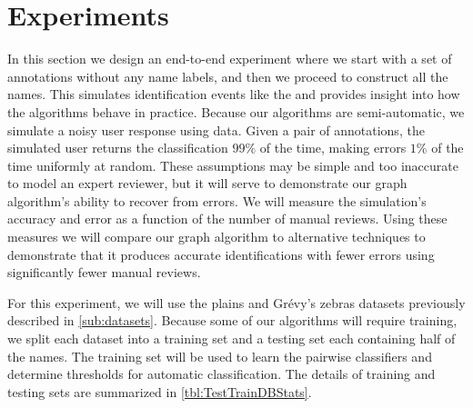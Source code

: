 \poisson{}




\section{Experiments}\label{sec:graphexpt}

    In this section we design an end-to-end experiment where we start with a set of annotations without any name
      labels, and then we proceed to construct all the names.
    This simulates identification events like the \GZC{} and provides insight into how the algorithms behave in
      practice.
    Because our algorithms are semi-automatic, we simulate a noisy user response using \groundtruth{} data.
    Given a pair of annotations, the simulated user returns the \groundtruth{} classification $99\percent$ of the
      time, making errors $1\percent$ of the time uniformly at random.
    These assumptions may be simple and too inaccurate to model an expert reviewer, but it will serve to
      demonstrate our graph algorithm's ability to recover from errors.
    We will measure the simulation's accuracy and error as a function of the number of manual reviews.
    Using these measures we will compare our graph algorithm to alternative techniques to demonstrate that it
      produces accurate identifications with fewer errors using significantly fewer manual reviews.

    For this experiment, we will use the plains and Grévy's zebras datasets previously described in
      \cref{sub:datasets}.
    Because some of our algorithms will require training, we split each dataset into a training set and a testing
      set each containing half of the names.
    The training set will be used to learn the pairwise classifiers and determine thresholds for automatic
      classification.
    The details of training and testing sets are summarized in \cref{tbl:TestTrainDBStats}.
    \TestTrainDBStats{}
    \FloatBarrier{}

